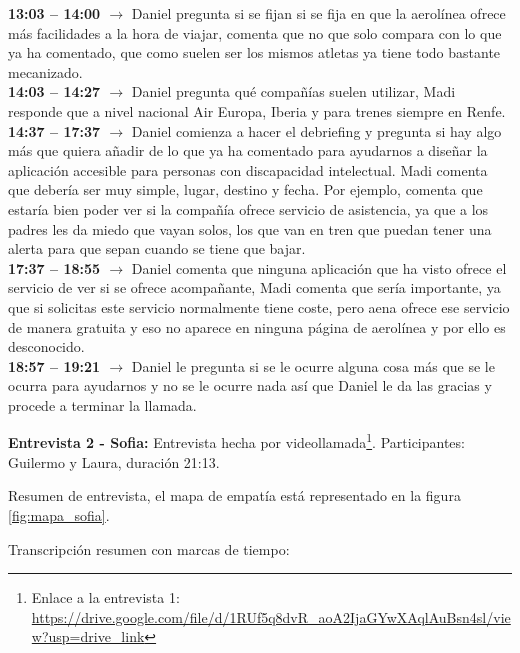 \textbf{13:03 -- 14:00 $\rightarrow$} Daniel pregunta si se fijan si se fija en que la aerolínea ofrece más facilidades a la hora de viajar, comenta que no que solo compara con lo que ya ha comentado, que como suelen ser los mismos atletas ya tiene todo bastante mecanizado. \\
\textbf{14:03 -- 14:27 $\rightarrow$} Daniel pregunta qué compañías suelen utilizar, Madi responde que a nivel nacional Air Europa, Iberia y para trenes siempre en Renfe. \\
\textbf{14:37 -- 17:37 $\rightarrow$} Daniel comienza a hacer el debriefing y pregunta si hay algo más que quiera añadir de lo que ya ha comentado para ayudarnos a diseñar la aplicación accesible para personas con discapacidad intelectual. Madi comenta que debería ser muy simple, lugar, destino y fecha. Por ejemplo, comenta que estaría bien poder ver si la compañía ofrece servicio de asistencia, ya que a los padres les da miedo que vayan solos, los que van en tren que puedan tener una alerta para que sepan cuando se tiene que bajar. \\
\textbf{17:37 -- 18:55 $\rightarrow$} Daniel comenta que ninguna aplicación que ha visto ofrece el servicio de ver si se ofrece acompañante, Madi comenta que sería importante, ya que si solicitas este servicio normalmente tiene coste, pero aena ofrece ese servicio de manera gratuita y eso no aparece en ninguna página de aerolínea y por ello es desconocido. \\
\textbf{18:57 -- 19:21 $\rightarrow$} Daniel le pregunta si se le ocurre alguna cosa más que se le ocurra para ayudarnos y no se le ocurre nada así que Daniel le da las gracias y procede a terminar la llamada.


\textbf{Entrevista 2 - Sofia:} Entrevista hecha por videollamada\footnote{Enlace a la entrevista 1: \url{https://drive.google.com/file/d/1RUf5q8dvR_aoA2IjaGYwXAqlAuBsn4sl/view?usp=drive_link}}. Participantes: Guilermo y Laura, duración 21:13.

Resumen de entrevista, el mapa de empatía está representado en la figura \ref{fig:mapa_sofia}.



Transcripción resumen con marcas de tiempo:

